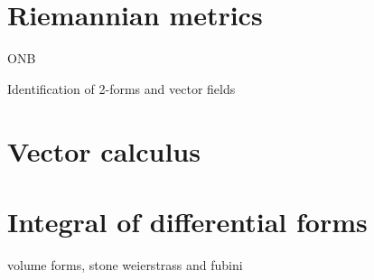 \documentclass{../../large}
\begin{document}
\begin{prb}
\end{prb}

\begin{prb}
\end{prb}

\begin{prb}
\end{prb}


\section{Riemannian metrics}


\begin{prb}
\end{prb}

\begin{prb}
ONB
\end{prb}


\begin{prb}
Identification of 2-forms and vector fields
\end{prb}

\section{Vector calculus}


\begin{prb}
\end{prb}

\begin{prb}[Potentials]
\end{prb}

\begin{prb}
\end{prb}



\section{Integral of differential forms}

\begin{prb}
volume forms,
stone weierstrass and fubini
\end{prb}

\begin{prb}

\end{prb}
\end{document}
